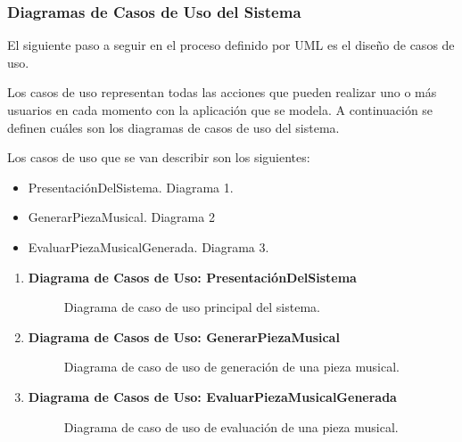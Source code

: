 \subsubsection{Diagramas de Casos de Uso del Sistema}

El siguiente paso a seguir en el proceso definido por UML es el diseño de casos de uso.

Los casos de uso representan todas las acciones que pueden realizar uno o más usuarios en cada momento con la aplicación que se modela. A continuación se definen cuáles son los diagramas de casos de uso del sistema.

Los casos de uso que se van describir son los siguientes:


\begin{itemize}

    \item PresentaciónDelSistema. Diagrama 1.

    \item GenerarPiezaMusical. Diagrama 2

    \item EvaluarPiezaMusicalGenerada. Diagrama 3.

\end{itemize}

\begin{enumerate}

\item{\textbf{Diagrama de Casos de Uso: PresentaciónDelSistema}}

\begin{figure}[H]
  \centering
  
  \caption{Diagrama de caso de uso principal del sistema.}
  \label{fig:caso-uso-presentaciondelsistema}
\end{figure}



\item{\textbf{Diagrama de Casos de Uso: GenerarPiezaMusical}}

\begin{figure}[H]
  \centering
  
  \caption{Diagrama de caso de uso de generación de una pieza musical.}
  \label{fig:caso-uso-generarpiezamusical}
\end{figure}



\item{\textbf{Diagrama de Casos de Uso: EvaluarPiezaMusicalGenerada}}

\begin{figure}[H]
  \centering
  
  \caption{Diagrama de caso de uso de evaluación de una pieza musical.}
  \label{fig:caso-uso-evaluarpiezamusicalgenerada}
\end{figure}


\end{enumerate}
